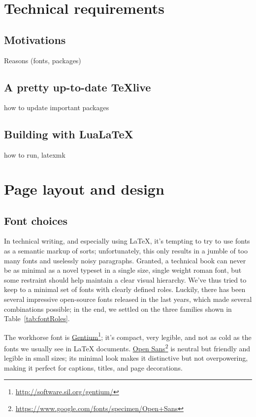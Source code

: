 \documentclass[english,twoside,openany,showtrims]{sbabook}
\newcommand\hrefnote[2]{%
  \href{#1}{#2}\footnote{\url{#1}}}
\begin{document}
\tableofcontents*
\mainmatter


\chapter{Technical requirements}


\section{Motivations}

Reasons (fonts, packages)


\section{A pretty up-to-date TeXlive}

how to update
important packages


\section{Building with Lua\LaTeX}

how to run, latexmk


\chapter{Page layout and design}


\section{Font choices}

In technical writing, and especially using \LaTeX{}, it's tempting to try to use
fonts as a semantic markup of sorts; unfortunately, this only results in a
jumble of too many fonts and uselessly noisy paragraphs.
Granted, a technical book can never be as minimal as a novel typeset in a single
size, single weight roman font, but some restraint should help maintain a clear
visual hierarchy.
We've thus tried to keep to a minimal set of fonts with clearly defined roles.
Luckily, there has been several impressive
open-source fonts released in the last years, which made several combinations
possible; in the end, we settled on the three families shown in
Table~\ref{tab:fontRoles}.

The workhorse font is \hrefnote{http://software.sil.org/gentium/}{Gentium}; it's
compact, very legible, and not as cold as the fonts we usually see in \LaTeX{}
documents.
\hrefnote{https://www.google.com/fonts/specimen/Open+Sans}{Open Sans} is neutral
but friendly and legible in small sizes; its minimal look makes it distinctive
but not overpowering, making it perfect for captions, titles, and page
decorations.
\end{document}
